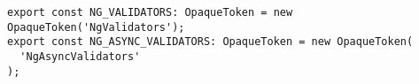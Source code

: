 \begin{verbatim}
export const NG_VALIDATORS: OpaqueToken = new OpaqueToken('NgValidators');
export const NG_ASYNC_VALIDATORS: OpaqueToken = new OpaqueToken(
  'NgAsyncValidators'
);
\end{verbatim}
